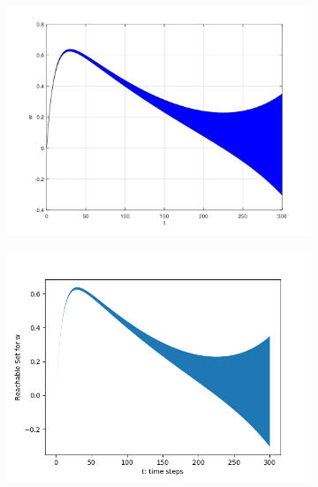 \documentclass[EPiC]{easychair}
\begin{document}
\begin{figure}[h]
    \begin{subfigure}{0.5\textwidth}
    \centering
    \includegraphics[width=\textwidth]{SapoFigures/Quad/SapoQuad_W.jpg}
    \end{subfigure}
    \begin{subfigure}{0.6\textwidth}
    \centering
    \includegraphics[width=\textwidth]{SapoFigures/Quad/KaaQuad_W.png}
    \end{subfigure}
    

\end{figure}
\end{document}
